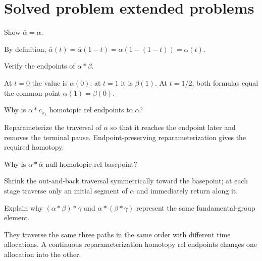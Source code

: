 \section{Solved problem extended problems}

\begin{problem}\label{prob:viii09-01}
Show \(\overline{\overline\alpha}=\alpha\).
\end{problem}
\begin{solution}
By definition, \(\overline{\overline\alpha}(t)=\overline\alpha(1-t)=\alpha(1-(1-t))=\alpha(t)\).
\end{solution}

\begin{problem}\label{prob:viii09-02}
Verify the endpoints of \(\alpha*\beta\).
\end{problem}
\begin{solution}
At \(t=0\) the value is \(\alpha(0)\); at \(t=1\) it is \(\beta(1)\).  At \(t=1/2\), both formulas equal the common point \(\alpha(1)=\beta(0)\).
\end{solution}

\begin{problem}\label{prob:viii09-03}
Why is \(\alpha*c_{x_1}\) homotopic rel endpoints to \(\alpha\)?
\end{problem}
\begin{solution}
Reparameterize the traversal of \(\alpha\) so that it reaches the endpoint later and removes the terminal pause.  Endpoint-preserving reparameterization gives the required homotopy.
\end{solution}

\begin{problem}\label{prob:viii09-04}
Why is \(\alpha*\overline\alpha\) null-homotopic rel basepoint?
\end{problem}
\begin{solution}
Shrink the out-and-back traversal symmetrically toward the basepoint; at each stage traverse only an initial segment of \(\alpha\) and immediately return along it.
\end{solution}

\begin{problem}[Associativity]\label{prob:viii09-05}
Explain why \((\alpha*\beta)*\gamma\) and \(\alpha*(\beta*\gamma)\) represent the same fundamental-group element.
\end{problem}
\begin{solution}
They traverse the same three paths in the same order with different time allocations.  A continuous reparameterization homotopy rel endpoints changes one allocation into the other.
\end{solution}

